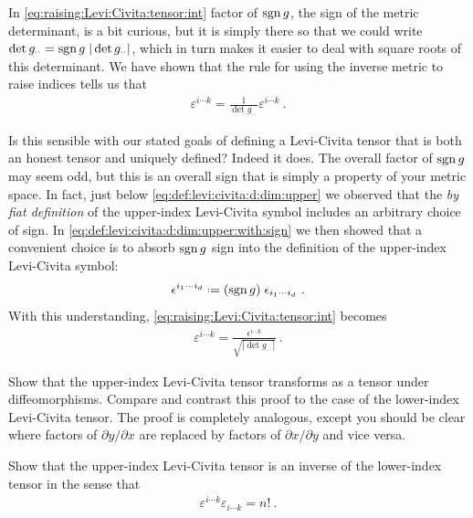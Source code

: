 \documentclass[12pt, oneside]{report}    %
\begin{document}
\begin{subappendices}
\begin{exercise}
\end{exercise}
% 
In \eqref{eq:raising:Levi:Civita:tensor:int} factor of $\operatorname{\textnormal{sgn}} g$, the sign of the metric determinant, is a bit curious, but it is simply there so that we could write $\det g_{\cdot\cdot} = \operatorname{\textnormal{sgn}}{g}\; |\det g_{\cdot\cdot}|$, which in turn makes it easier to deal with square roots of this determinant. We have shown that the rule for using the inverse metric to raise indices tells us that
\begin{align}
    \varepsilon^{i\cdots k} = \frac{1}{\det{g_{\cdot\cdot}}} \varepsilon^{i\cdots k}  \ .
\end{align}

Is this sensible with our stated goals of defining a Levi-Civita tensor that is both an honest tensor and uniquely defined? Indeed it does. 
% 
The overall factor of $\operatorname{\textnormal{sgn}} g$ may seem odd, but this is an overall sign that is simply a property of your metric space. In fact, just below \eqref{eq:def:levi:civita:d:dim:upper} we observed that the \emph{by fiat definition} of the upper-index Levi-Civita symbol includes an arbitrary choice of sign. In 
\eqref{eq:def:levi:civita:d:dim:upper:with:sign} we then showed that a convenient choice is to absorb $\operatorname{\textnormal{sgn}} g$ sign into the definition of the upper-index Levi-Civita symbol:
\begin{align}
    \epsilon^{i_1\cdots i_d}
    \defeq
    (\sgn g) \;
    \epsilon_{i_1\cdots i_d} \ .
\end{align}
With this understanding, \eqref{eq:raising:Levi:Civita:tensor:int} becomes
\begin{align}
    \varepsilon^{i\cdots k}
    = \frac{\epsilon^{i\cdots k}}{\sqrt{|\det g_{\cdot\cdot}|}}  \ .
\end{align}

\begin{exercise}
Show that the upper-index Levi-Civita tensor transforms as a tensor under diffeomorphisms. Compare and contrast this proof to the case of the lower-index Levi-Civita tensor. The proof is completely analogous, except you should be clear where factors of $\partial y/\partial x$ are replaced by factors of $\partial x/\partial y$ and vice versa.
\end{exercise}

\begin{exercise}
Show that the upper-index Levi-Civita tensor is an inverse of the lower-index tensor in the sense that
\begin{align}
    \varepsilon^{i\cdots k}\varepsilon_{i\cdots k} = n! \ .
\end{align}
\end{exercise}

\end{subappendices}
\end{document}
